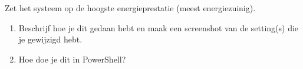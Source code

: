 Zet het systeem op de hoogste energieprestatie (meest energiezuinig).
\begin{enumerate}
\item Beschrijf hoe je dit gedaan hebt en maak een screenshot van de setting(s) die je gewijzigd hebt.
\item Hoe doe je dit in PowerShell?
\end{enumerate}

